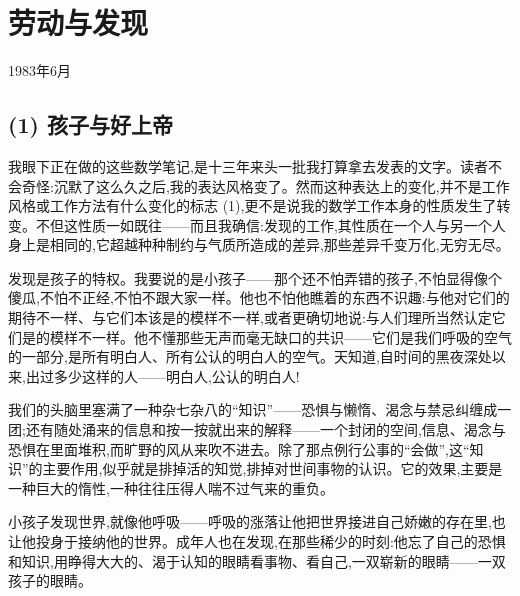 \chapter{劳动与发现}

\noindent 1983年6月\par

\section{(1) 孩子与好上帝}

 我眼下正在做的这些数学笔记,是十三年来头一批我打算拿去发表的文字。读者不会奇怪:沉默了这么久之后,我的表达风格变了。然而这种表达上的变化,并不是工作风格或工作方法有什么变化的标志 (1),更不是说我的数学工作本身的性质发生了转变。不但这性质一如既往——而且我确信:发现的工作,其性质在一个人与另一个人身上是相同的,它超越种种制约与气质所造成的差异,那些差异千变万化,无穷无尽。

发现是孩子的特权。我要说的是小孩子——那个还不怕弄错的孩子,不怕显得像个傻瓜,不怕不正经,不怕不跟大家一样。他也不怕他瞧着的东西不识趣:与他对它们的期待不一样、与它们本该是的模样不一样,或者更确切地说:与人们理所当然认定它们是的模样不一样。他不懂那些无声而毫无缺口的共识——它们是我们呼吸的空气的一部分,是所有明白人、所有公认的明白人的空气。天知道,自时间的黑夜深处以来,出过多少这样的人——明白人,公认的明白人!

我们的头脑里塞满了一种杂七杂八的“知识”——恐惧与懒惰、渴念与禁忌纠缠成一团;还有随处涌来的信息和按一按就出来的解释——一个封闭的空间,信息、渴念与恐惧在里面堆积,而旷野的风从来吹不进去。除了那点例行公事的“会做”,这“知识”的主要作用,似乎就是排掉活的知觉,排掉对世间事物的认识。它的效果,主要是一种巨大的惰性,一种往往压得人喘不过气来的重负。

小孩子发现世界,就像他呼吸——呼吸的涨落让他把世界接进自己娇嫩的存在里,也让他投身于接纳他的世界。成年人也在发现,在那些稀少的时刻:他忘了自己的恐惧和知识,用睁得大大的、渴于认知的眼睛看事物、看自己,一双崭新的眼睛——一双孩子的眼睛。

